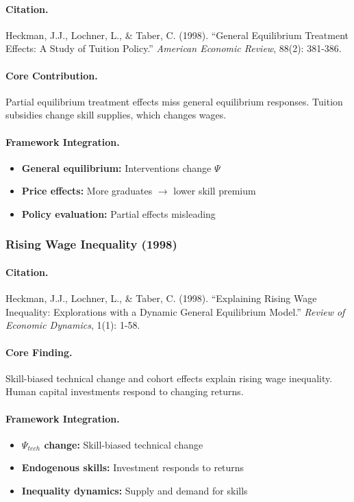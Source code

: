 \documentclass[12pt,a4paper]{article}
\begin{document}
\paragraph{Citation.}
Heckman, J.J., Lochner, L., \& Taber, C. (1998). ``General Equilibrium
Treatment Effects: A Study of Tuition Policy.''
\emph{American Economic Review}, 88(2): 381-386.

\paragraph{Core Contribution.}
Partial equilibrium treatment effects miss general equilibrium responses.
Tuition subsidies change skill supplies, which changes wages.

\paragraph{Framework Integration.}
\begin{itemize}
  \item \textbf{General equilibrium:} Interventions change $\Psi$
  \item \textbf{Price effects:} More graduates $\to$ lower skill premium
  \item \textbf{Policy evaluation:} Partial effects misleading
\end{itemize}

\subsubsection{Rising Wage Inequality (1998)}

\paragraph{Citation.}
Heckman, J.J., Lochner, L., \& Taber, C. (1998). ``Explaining Rising
Wage Inequality: Explorations with a Dynamic General Equilibrium Model.''
\emph{Review of Economic Dynamics}, 1(1): 1-58.

\paragraph{Core Finding.}
Skill-biased technical change and cohort effects explain rising
wage inequality. Human capital investments respond to changing returns.

\paragraph{Framework Integration.}
\begin{itemize}
  \item \textbf{$\Psi_{tech}$ change:} Skill-biased technical change
  \item \textbf{Endogenous skills:} Investment responds to returns
  \item \textbf{Inequality dynamics:} Supply and demand for skills
\end{itemize}
\end{document}
